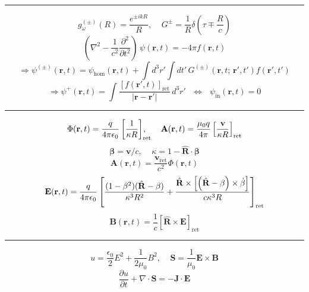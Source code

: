 \documentclass[twocolumn]{article}
\newcommand{\0}{\textcolor{gray}{0}}
\newcommand{\di}{\nabla\cdot}
\newcommand{\la}{\nabla^2}
\newcommand{\rv}{\mathbf{r}}
\newcommand{\Rhat}{\hat{\mathbf{R}}}
\newcommand{\eo}{\epsilon_{0}}
\newcommand{\uo}{\mu_{0}}
\newcommand{\rdif}{\rv - \rv'}
\newcommand{\pd}[2]{\dfrac{\partial #1}{\partial #2}}
\newcommand{\n}[1]{\mathbf{#1}}
\begin{document}
\vspace{-2mm}\hrule\vspace{2mm}
\begin{equation*}
	g_{\omega}^{(\pm)} (R) = \frac{e^{\pm ikR}}{R}, ~~~~~	G^{\pm} = \frac{1}{R} \delta\left(\tau \mp \frac{R}{c}\right)
\end{equation*}
\begin{equation*}
	\left(\la - \frac{1}{c^2} \pd{^2}{t^2}\right)\, \psi(\rv,t) = -4 \pi f(\rv, t)
\end{equation*}
\begin{equation*}
	\Rightarrow \psi^{(\pm)}(\rv,t) = \psi_{\mathrm{hom}}(\rv,t) + \int d^3 r' \int dt'\, G^{(\pm)}(\rv,t; \, \rv', t') f(\rv', t')
\end{equation*}
\begin{equation*}
	\Rightarrow \psi^{+}(\rv,t) = \int \frac{\left[f(\rv',t)\right]_{\mathrm{ret}}}{|\rdif|}\, d^3 r' ~~~ \Leftrightarrow ~~~ \psi_{\mathrm{in}}(\rv,t) = 0
\end{equation*}
\vspace{-2mm}\hrule
\begin{align*}
	\Phi(\rv,t)  = \ke[q] \left[\frac{1}{\kappa R}\right]_{\mathrm{ret}}\hspace{-4mm}, ~~~~~	\n{A}(\rv,t) = \ku[q] \left[\frac{\n{v}}{\kappa R}\right]_{\mathrm{ret}} 
\end{align*}
\begin{equation*}
\n{\beta} = \n{v}/c, ~~~~~ \kappa = 1 - \Rhat\cdot\n{\beta}
\end{equation*}
\begin{equation*}
	\n{A}(\rv,t) = \frac{\n{v}_{\mathrm{ret}}}{c^2} \Phi(\rv,t)
\end{equation*}
\begin{equation*}
	\n{E}(\rv,t) = \ke[q] \left[\frac{(1 - \beta^2)(\Rhat - \beta)}{\kappa^3 R^2} + \frac{\Rhat\times\left[\left(\Rhat - \beta\right)\times\dot{\beta}\right]}{c \kappa^3 R}\right]_{\mathrm{ret}}
\end{equation*}
\begin{equation*}
	\n{B}(\rv, t) = \frac{1}{c}\left[\Rhat\times\n{E}\right]_{\mathrm{ret}}
\end{equation*}
\hrule\vspace{1mm}
\begin{equation*}
	u = \frac{\eo}{2} E^2 + \frac{1}{2\uo}B^2, ~~~~~ \n{S} = \frac{1}{\uo} \n{E}\times\n{B}
\end{equation*}
\begin{equation*}
	\pd{u}{t} + \di\n{S} = -\n{J}\cdot\n{E}
\end{equation*}
\end{document}
